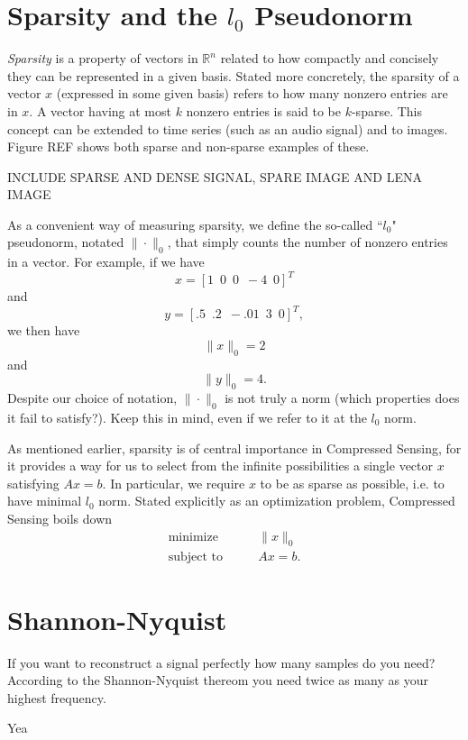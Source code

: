 \section*{Sparsity and the $l_0$ Pseudonorm}
\emph{Sparsity} is a property of vectors in $\mathbb{R}^n$ related to how compactly and concisely they can
be represented in a given basis. Stated more concretely, the sparsity of a vector $x$ (expressed in some given
basis) refers to how many nonzero entries are in $x$. A vector having at most $k$ nonzero entries is said to be
$k$-sparse. This concept can be extended to time series (such as an audio signal) and to images. Figure REF shows
both sparse and non-sparse examples of these.

INCLUDE SPARSE AND DENSE SIGNAL, SPARE IMAGE AND LENA IMAGE

As a convenient way of measuring sparsity, we define the so-called ``$l_0$" pseudonorm, notated $\|\cdot\|_0$,
that simply counts the number of nonzero entries in a vector. For example, if we have
\[
x = [1\,\,\,0\,\,\,0\,\,\,-4\,\,\,0]^T
\]
and
\[
y = [.5\,\,\,.2\,\,\,-.01\,\,\,3\,\,\,0]^T,
\]
we then have
\[
\|x\|_0 = 2
\]
and
\[
\|y\|_0 = 4.
\]
Despite our choice of notation, $\|\cdot\|_0$ is not truly a norm (which properties does it fail to satisfy?).
Keep this in mind, even if we refer to it at the $l_0$ norm. 

As mentioned earlier, sparsity is of central importance in Compressed Sensing, for it provides a way for us to 
select from the infinite possibilities a single vector $x$ satisfying $Ax = b$. In particular, we require $x$ to 
be as sparse as possible, i.e. to have minimal $l_0$ norm. Stated explicitly as an optimization problem, Compressed
Sensing boils down 
\begin{align*}
\text{minimize}\qquad &\|x\|_0\\
\text{subject to} \qquad &Ax = b.
\end{align*}


\section*{Shannon-Nyquist}

If you want to reconstruct a signal perfectly how many samples do you need? According to the  Shannon-Nyquist thereom you need twice as many as your highest frequency.


\begin{problem}
Yea
\end{problem}


